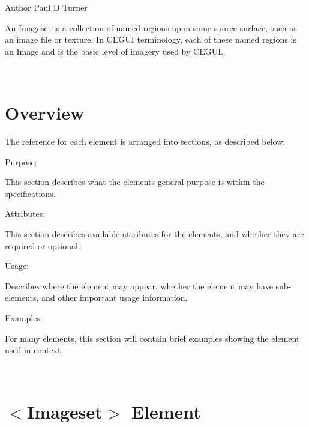 \begin{DoxyAuthor}{Author}
Paul D Turner
\end{DoxyAuthor}
An Imageset is a collection of named regions upon some source surface, such as an image file or texture. In C\+E\+G\+UI terminology, each of these named regions is an Image and is the basic level of imagery used by C\+E\+G\+UI.

~\newline
 \hypertarget{xml_imageset_xml_imageset_overview}{}\section{Overview}\label{xml_imageset_xml_imageset_overview}
The reference for each element is arranged into sections, as described below\+:
\begin{DoxyItemize}
\item Purpose\+:
\begin{DoxyItemize}
\item This section describes what the elements general purpose is within the specifications.
\end{DoxyItemize}
\item Attributes\+:
\begin{DoxyItemize}
\item This section describes available attributes for the elements, and whether they are required or optional.
\end{DoxyItemize}
\item Usage\+:
\begin{DoxyItemize}
\item Describes where the element may appear, whether the element may have sub-\/elements, and other important usage information.
\end{DoxyItemize}
\item Examples\+:
\begin{DoxyItemize}
\item For many elements, this section will contain brief examples showing the element used in context.
\end{DoxyItemize}
\end{DoxyItemize}

~\newline
 \hypertarget{xml_imageset_xml_imageset_imageset}{}\section{$<$\+Imageset$>$ Element}\label{xml_imageset_xml_imageset_imageset}

